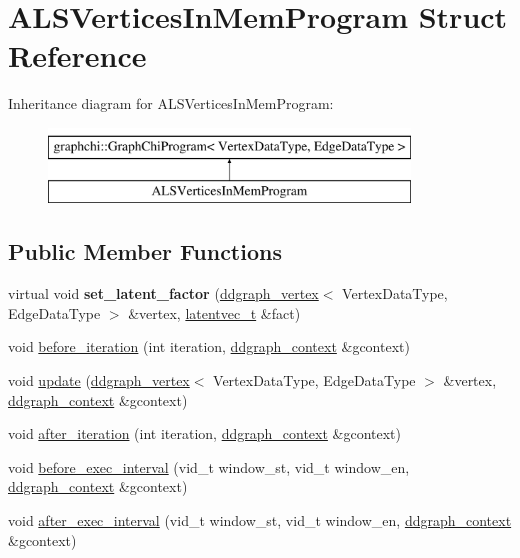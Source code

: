 \hypertarget{struct_a_l_s_vertices_in_mem_program}{\section{A\-L\-S\-Vertices\-In\-Mem\-Program Struct Reference}
\label{struct_a_l_s_vertices_in_mem_program}
}
Inheritance diagram for A\-L\-S\-Vertices\-In\-Mem\-Program\-:\begin{figure}[H]
\begin{center}
\leavevmode
\includegraphics[height=2.000000cm]{struct_a_l_s_vertices_in_mem_program}
\end{center}
\end{figure}
\subsection*{Public Member Functions}
\begin{DoxyCompactItemize}
\item 
\hypertarget{struct_a_l_s_vertices_in_mem_program_aa10200a9a239d9816e51f876985aec3c}{virtual void {\bfseries set\-\_\-latent\-\_\-factor} (\hyperlink{classddgraph_1_1ddgraph__vertex}{ddgraph\-\_\-vertex}$<$ Vertex\-Data\-Type, Edge\-Data\-Type $>$ \&vertex, \hyperlink{structlatentvec__t}{latentvec\-\_\-t} \&fact)}\label{struct_a_l_s_vertices_in_mem_program_aa10200a9a239d9816e51f876985aec3c}

\item 
void \hyperlink{struct_a_l_s_vertices_in_mem_program_ad9a6a2fdf9c1e996b89ebef238a45de1}{before\-\_\-iteration} (int iteration, \hyperlink{structddgraph_1_1ddgraph__context}{ddgraph\-\_\-context} \&gcontext)
\item 
void \hyperlink{struct_a_l_s_vertices_in_mem_program_a79ab59ee2ac716c0a4c7489c5bffe987}{update} (\hyperlink{classddgraph_1_1ddgraph__vertex}{ddgraph\-\_\-vertex}$<$ Vertex\-Data\-Type, Edge\-Data\-Type $>$ \&vertex, \hyperlink{structddgraph_1_1ddgraph__context}{ddgraph\-\_\-context} \&gcontext)
\item 
void \hyperlink{struct_a_l_s_vertices_in_mem_program_ad5f96d529e7b579610944c660269b136}{after\-\_\-iteration} (int iteration, \hyperlink{structddgraph_1_1ddgraph__context}{ddgraph\-\_\-context} \&gcontext)
\item 
void \hyperlink{struct_a_l_s_vertices_in_mem_program_a36db7afcd9ec22c1ddbe378f91f0fe5e}{before\-\_\-exec\-\_\-interval} (vid\-\_\-t window\-\_\-st, vid\-\_\-t window\-\_\-en, \hyperlink{structddgraph_1_1ddgraph__context}{ddgraph\-\_\-context} \&gcontext)
\item 
void \hyperlink{struct_a_l_s_vertices_in_mem_program_a0a71542edb0835aa1bedf5cc1ef83975}{after\-\_\-exec\-\_\-interval} (vid\-\_\-t window\-\_\-st, vid\-\_\-t window\-\_\-en, \hyperlink{structddgraph_1_1ddgraph__context}{ddgraph\-\_\-context} \&gcontext)
\end{DoxyCompactItemize}
